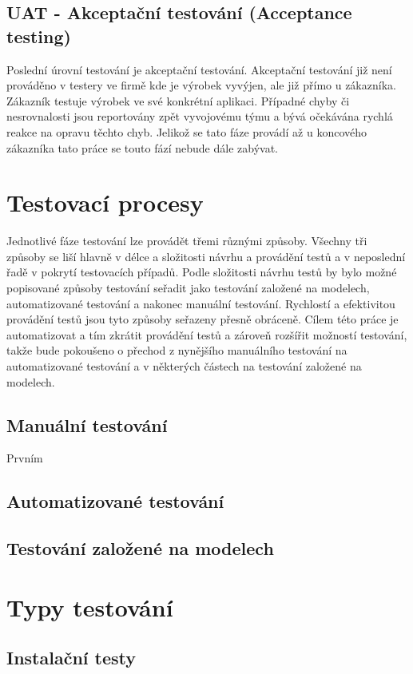 \subsection{UAT - Akceptační testování (Acceptance testing)}
Poslední úrovní testování je akceptační testování. Akceptační testování již není prováděno v testery ve firmě kde je výrobek vyvýjen, ale již přímo u zákazníka. Zákazník testuje výrobek ve své konkrétní aplikaci. Případné chyby či nesrovnalosti jsou reportovány zpět vyvojovému týmu a bývá očekávána rychlá reakce na opravu těchto chyb. Jelikož se tato fáze provádí až u koncového zákazníka tato práce se touto fází nebude dále zabývat.


\section{Testovací procesy}
Jednotlivé fáze testování lze provádět třemi různými způsoby. Všechny tři způsoby se liší hlavně v délce a složitosti návrhu a provádění testů a v neposlední řadě v pokrytí testovacích případů. Podle složitosti návrhu testů by bylo možné popisované způsoby testování seřadit jako testování založené na modelech, automatizované testování a nakonec manuální testování. Rychlostí a efektivitou provádění testů jsou tyto způsoby seřazeny přesně obráceně. Cílem této práce je automatizovat a tím zkrátit provádění testů a zároveň rozšířit možností testování, takže bude pokoušeno o přechod z nynějšího manuálního testování na automatizované testování a v některých částech na testování založené na modelech.

\subsection{Manuální testování}
Prvním 


\subsection{Automatizované testování}
\subsection{Testování založené na modelech}


\section{Typy testování}

\subsection{Instalační testy}
